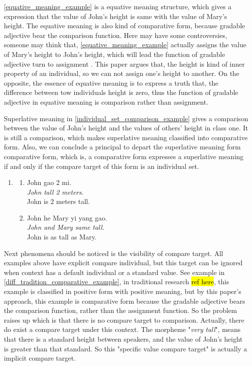 \documentclass{ctexart}
\let \cite \parencite
\begin{document}
\ref{equative_meaning_example} is a equative meaning structure, which gives a expression that the value of John's height is same with the value of Mary's height. The equative meaning is also kind of comparative form, because gradable adjective bear the comparison function. Here may have some controversies, someone may think that, \ref{equative_meaning_example} actually assigns the value of Mary's height to John's height, which will lead the function of gradable adjective turn to assignment \cite{guo2012}. This paper argues that, the height is kind of inner property of an individual, so we can not assign one's height to another. On the opposite, the essence of equative meaning is to express a truth that, the difference between tow individuals height is zero, thus the function of gradable adjective in equative meaning is comparison rather than assignment.

Superlative meaning in \ref{individual_set_comparison_example} gives a comparison between the value of John's height and the values of others' height in class one. It is still a comparison, which makes superlative meaning classified into comparative form. Also, we can conclude a principal to depart the superlative meaning form comparative form, which is, a comparative form expresses a superlative meaning if and only if the compare target of this form is an individual set.

\begin{enumerate}[resume]
    \item
    \begin{enumerate}[ref=(\arabic{enumi}\alph*)]
        \item \label{positive_meaning_example}
        John gao 2 mi.\\
        \textit{John tall 2 meters.} \\
        John is 2 meters tall.

        \item \label{equative_meaning_example}
        John he Mary yi yang gao.\\
        \textit{John and Mary same tall.}\\
        John is as tall as Mary.

    \end{enumerate}
\end{enumerate}

Next phenomena should be noticed is the visibility of compare target. All examples above have explicit compare individual, but this target can be ignored when context has a default individual or a standard value. See example in \ref{diff_tradition_comparative_example}, in traditional research \hl{ref here}, this example is classified in positive form with positive meaning, but by this paper's approach, this example is comparative form because the gradable adjective bears the comparison function, rather than the assignment function. So the problem raises up which is that there is no compare target to comparison. Actually, there do exist a compare target under this context. The morpheme "\textit{very tall}", means that there is a standard height between speakers, and the value of John's height is greater than that standard. So this "specific value compare target" is actually a implicit compare target.
\end{document}
